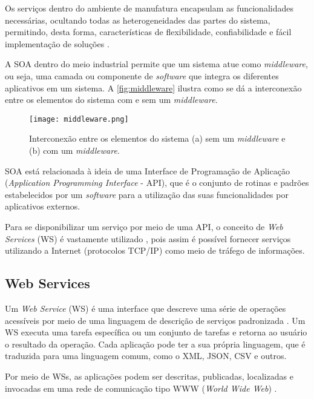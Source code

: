Os serviços dentro do ambiente de manufatura encapsulam as funcionalidades necessárias, ocultando todas as heterogeneidades das partes do sistema, permitindo, desta forma, características de flexibilidade, confiabilidade e fácil implementação de	soluções \cite{groba2008soa}.

A SOA dentro do meio industrial permite que um sistema atue como \textit{middleware}, ou seja, uma camada ou componente de \textit{software} que integra os diferentes aplicativos em um sistema. A \autoref{fig:middleware} ilustra como se dá a interconexão entre os elementos do sistema com e sem um \textit{middleware}.

\begin{figure}[htb]
	\centering
	\texttt{[image: middleware.png]}
	\caption{Interconexão entre os elementos do sistema (a) sem um \textit{middleware} e (b) com um \textit{middleware}.}
	\label{fig:middleware}
\end{figure}

SOA está relacionada à ideia de uma Interface de Programação de Aplicação (\textit{Application Programming Interface} - API), que é o conjunto de rotinas e padrões estabelecidos por um \textit{software} para a utilização das suas funcionalidades por aplicativos externos.

Para se disponibilizar um serviço por meio de uma API, o conceito de \textit{Web Services} (WS) é vastamente utilizado \cite{souit2013soa}, pois assim é possível fornecer serviços utilizando a Internet (protocolos TCP/IP) como meio de tráfego de informações.

\subsection{Web Services}

Um \textit{Web Service} (WS) é uma interface que descreve uma série de operações acessíveis por meio de uma linguagem de descrição de serviços padronizada \cite{gottschalk2002webservices}. Um WS executa uma tarefa específica ou um conjunto de tarefas e retorna ao usuário o resultado da operação. Cada aplicação pode ter a sua própria linguagem, que é traduzida para uma linguagem comum, como o XML, JSON, CSV e outros.

Por meio de WSs, as aplicações podem ser descritas, publicadas, localizadas e invocadas em uma rede de comunicação tipo WWW (\textit{World Wide Web}) \cite{souit2013soa}.

